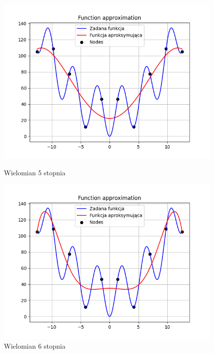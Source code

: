 \documentclass{article}
\begin{document}
\begin{figure}[H]
  \begin{minipage}[b]{0.49\textwidth}
    \begin{minipage}[b]{\textwidth}
      \includegraphics[width=\textwidth]{img06.png}
      \caption{Wielomian 5 stopnia}
    \end{minipage}
    \vspace*{\fill}
    \begin{minipage}[b]{\textwidth}
      \includegraphics[width=\textwidth]{img07.png}
      \caption{Wielomian 6 stopnia}
    \end{minipage}
  \end{minipage}
  \hfill
  \begin{minipage}[b]{0.49\textwidth}

\end{minipage}
\end{figure}
\end{document}
